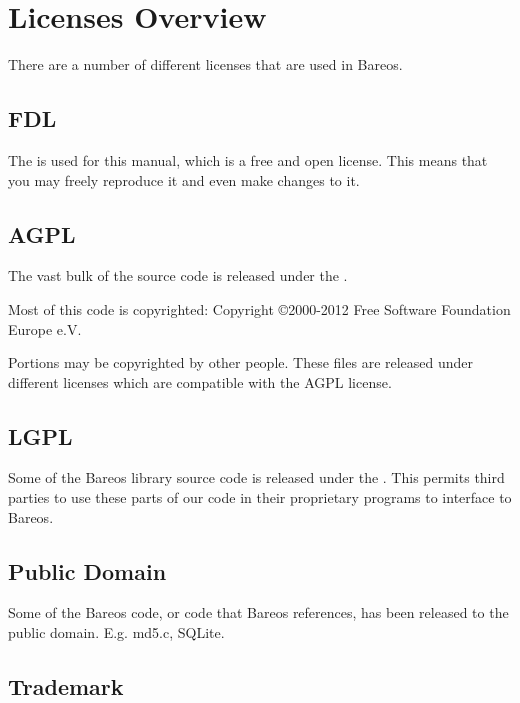 
\section{Licenses Overview}

There are a number of different licenses that are used in Bareos.

\subsection*{FDL}

The  is used for this manual,
which is a free and open license. This means that you may freely
reproduce it and even make changes to it.


\subsection*{AGPL}

The vast bulk of the source code is released under the
.

Most of this code is copyrighted: Copyright \copyright 2000-2012
Free Software Foundation Europe e.V.

Portions may be copyrighted by other people.  These files are released
under different licenses which are compatible with the AGPL license.

\subsection*{LGPL}

Some of the Bareos library source code is released under the
. This
permits third parties to use these parts of our code in their proprietary
programs to interface to Bareos.

\subsection*{Public Domain}

Some of the Bareos code, or code that Bareos references, has been released
to the public domain. E.g. md5.c, SQLite.

\subsection*{Trademark}

